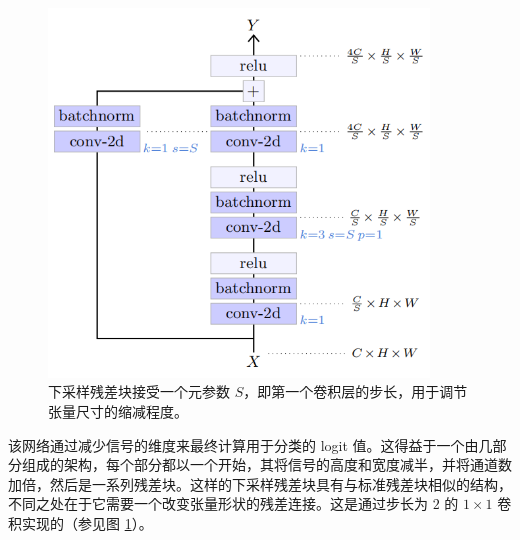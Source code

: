 \begin{figure}
    \centering
    \includegraphics[width=0.9\textwidth]{fig/fig5.4.png}
    \caption[下采样残差块]{下采样残差块接受一个元参数 $S$，即第一个卷积层的步长，用于调节张量尺寸的缩减程度。}
    \label{fig5.4}
\end{figure}

该网络通过减少信号的维度来最终计算用于分类的 logit 值。这得益于一个由几部分组成的架构，每个部分都以一个开始，其将信号的高度和宽度减半，并将通道数加倍，然后是一系列残差块。这样的下采样残差块具有与标准残差块相似的结构，不同之处在于它需要一个改变张量形状的残差连接。这是通过步长为 $2$ 的 $1 \times 1$ 卷积实现的（参见图 \ref{fig5.4}）。

